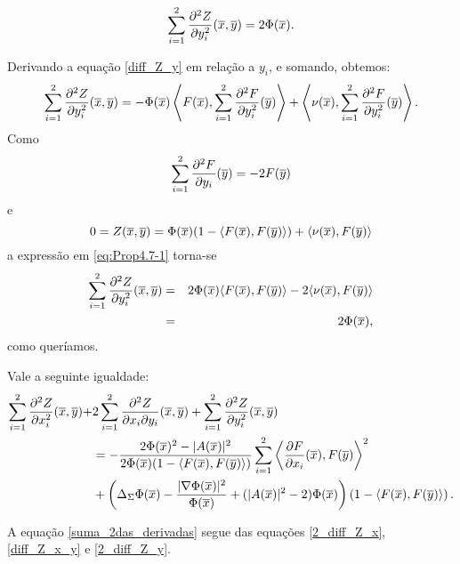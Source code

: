 \begin{proposicao}
\begin{equation}\label{2_diff_Z_y}
\sum_{i=1}^2 \frac{\partial^2 Z}{\partial y_i^2}(\overline{x},\overline{y}) = 2 \Phi(\overline{x}).
\end{equation}
\end{proposicao}
\begin{demonstracao}
Derivando a equa\c c\~ao \eqref{diff_Z_y} em rela\c c\~ao a $y_i$,
e somando, obtemos:
\begin{eqnarray} \label{eq:Prop4.7-1}
\sum_{i=1}^2 \frac{\partial^2 Z}{\partial y_i^2}(\overline{x},\overline{y}) = - \Phi(\overline{x}) \left\langle F(\overline{x}), \sum_{i=1}^2 \frac{\partial^2 F}{\partial y_i^2}(\overline{y}) \right\rangle + \left\langle \nu(\overline{x}), \sum_{i=1}^2 \frac{\partial^2 F}{\partial y_i^2}(\overline{y}) \right\rangle.
\end{eqnarray}	
Como
\[
\sum_{i=1}^2 \frac{\partial^2 F}{\partial y_i}(\overline{y}) = -2 F(\overline{y})
\]
e
\[
0 = Z(\overline{x},\overline{y}) = \Phi(\overline{x})(1 - \langle F(\overline{x}), F(\overline{y}) \rangle) + 
\langle \nu(\overline{x}), F(\overline{y}) \rangle
\] 
a express\~ao em \eqref{eq:Prop4.7-1} torna-se
\begin{eqnarray*}
\sum_{i=1}^2 \frac{\partial^2 Z}{\partial y_i^2}(\overline{x},\overline{y}) &=&
2 \Phi(\overline{x}) \langle F(\overline{x}), F(\overline{y}) \rangle - 2 \langle \nu(\overline{x}), F(\overline{y}) 
\rangle \\
&=&
2 \Phi(\overline{x}),
\end{eqnarray*}
como quer\'iamos.
\end{demonstracao}


\begin{proposicao} \label{prop:somaDerSeg}
Vale a seguinte igualdade:
\begin{eqnarray} \label{suma_2das_derivadas}
\begin{aligned}
\sum_{i=1}^2 \frac{\partial^2 Z}{\partial x_i^2}(\overline{x},\overline{y}) + & 
2 \sum_{i=1}^2 \frac{\partial^2 Z}{\partial x_i \partial y_i}(\overline{x},\overline{y}) + \sum_{i=1}^2 \frac{\partial^2 Z}{\partial y_i^2}(\overline{x},\overline{y}) \\
&= 
- \frac{2 \Phi(\overline{x})^2- |A(\overline{x})|^2}{2 \Phi(\overline{x})
(1 - \langle F(\overline{x}),F(\overline{y}) \rangle)} \sum_{i=1}^2
\left\langle \frac{\partial F}{\partial x_i}(\overline{x}), F(\overline{y}) \right\rangle^2 \\
&+
\left( \Delta_{\Sigma} \Phi(\overline{x}) - \frac{| \nabla \Phi(\overline{x}) |^2}
{\Phi(\overline{x})} + ( | A(\overline{x}) |^2 - 2 ) \Phi(\overline{x}) \right)
\left(1 - \langle F(\overline{x}),F(\overline{y}) \rangle\right).
\end{aligned}
\end{eqnarray}
\end{proposicao}
\begin{demonstracao}
A equa\c c\~ao \eqref{suma_2das_derivadas} segue das equa\c c\~oes \eqref{2_diff_Z_x}, \eqref{diff_Z_x_y} e \eqref{2_diff_Z_y}.
\end{demonstracao}



